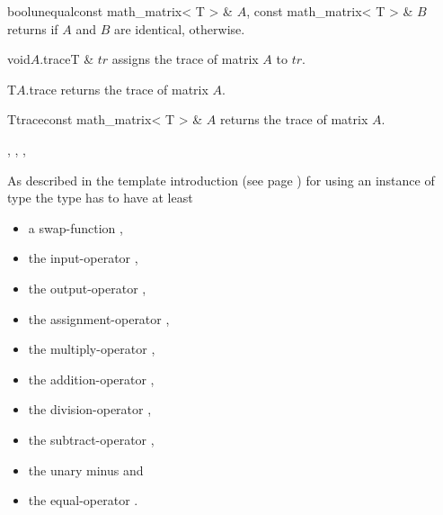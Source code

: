 \begin{fcode}{bool}{unequal}{const math_matrix< T > & $A$, const math_matrix< T > & $B$}
  returns \FALSE if $A$ and $B$ are identical, \TRUE otherwise.
\end{fcode}




\begin{cfcode}{void}{$A$.trace}{T & $\mathit{tr}$}
  assigns the trace of matrix $A$ to $\mathit{tr}$.
\end{cfcode}

\begin{cfcode}{T}{$A$.trace}{}
  returns the trace of matrix $A$.
\end{cfcode}

\begin{fcode}{T}{trace}{const math_matrix< T > & $A$}
  returns the trace of matrix $A$.
\end{fcode}



\SEEALSO

, ,
, 



\NOTES

As described in the template introduction (see page \pageref{template_introduction2}) for using
an instance of type  the type  has to have at least
\begin{itemize}
\item a swap-function ,
\item the input-operator \code{>>},
\item the output-operator \code{<<},
\item the assignment-operator \code{=},
\item the multiply-operator \code{*},
\item the addition-operator \code{+},
\item the division-operator \code{/},
\item the subtract-operator \code{-},
\item the unary minus \code{-} and
\item the equal-operator \code{==}.
\end{itemize}



